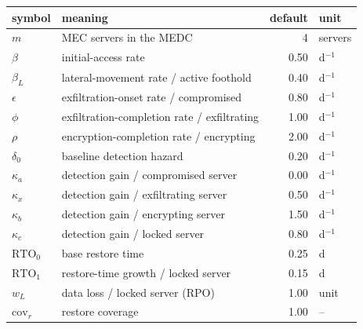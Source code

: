 \begin{tabular}{@{}llrl@{}}
\toprule
symbol & meaning & default & unit\\
\midrule
$m$ & MEC servers in the MEDC & 4 & servers\\
$\beta$ & initial-access rate & 0.50 & d$^{-1}$\\
$\beta_L$ & lateral-movement rate / active foothold & 0.40 & d$^{-1}$\\
$\epsilon$ & exfiltration-onset rate / compromised & 0.80 & d$^{-1}$\\
$\phi$ & exfiltration-completion rate / exfiltrating & 1.00 & d$^{-1}$\\
$\rho$ & encryption-completion rate / encrypting & 2.00 & d$^{-1}$\\
$\delta_0$ & baseline detection hazard & 0.20 & d$^{-1}$\\
$\kappa_a$ & detection gain / compromised server & 0.00 & d$^{-1}$\\
$\kappa_x$ & detection gain / exfiltrating server & 0.50 & d$^{-1}$\\
$\kappa_b$ & detection gain / encrypting server & 1.50 & d$^{-1}$\\
$\kappa_c$ & detection gain / locked server & 0.80 & d$^{-1}$\\
$\mathrm{RTO}_0$ & base restore time & 0.25 & d\\
$\mathrm{RTO}_1$ & restore-time growth / locked server & 0.15 & d\\
$w_L$ & data loss / locked server (RPO) & 1.00 & unit\\
$\mathrm{cov}_r$ & restore coverage & 1.00 & --\\
\bottomrule
\end{tabular}
